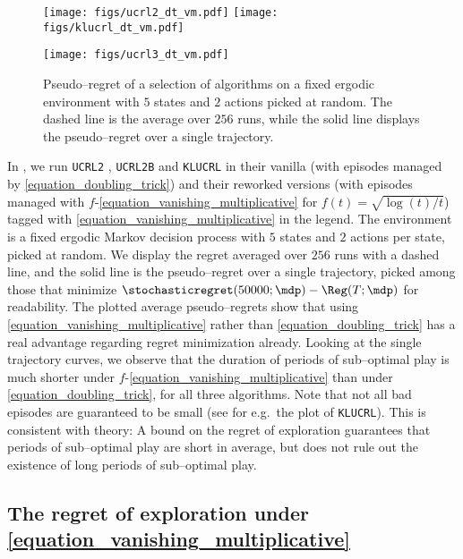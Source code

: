 \documentclass[preprint,cleveref,12pt]{colt2025}
\def\model{\mdp}
\begin{document}
    \begin{figure}[ht]
        \centering
        \texttt{[image: figs/ucrl2\_dt\_vm.pdf]}
        \hfill
        \texttt{[image: figs/klucrl\_dt\_vm.pdf]}

        \texttt{[image: figs/ucrl3\_dt\_vm.pdf]}
        \caption{
        \label{figure_single_trajectories}
            Pseudo--regret of a selection of algorithms on a fixed ergodic environment with $5$ states and $2$ actions picked at random.
            The dashed line is the average over $256$ runs, while the solid line displays the pseudo--regret over a single trajectory. 
        }
    \end{figure}

    In , we run \texttt{UCRL2} \cite{auer_near_optimal_2009}, \texttt{UCRL2B} \cite{fruit_improved_2020} and \texttt{KLUCRL} \cite{filippi_optimism_2010} in their vanilla (with episodes managed by \eqref{equation_doubling_trick}) and their reworked versions (with episodes managed with $f$-\eqref{equation_vanishing_multiplicative} for $f(t) = \sqrt{\log(t)/t}$) tagged with \eqref{equation_vanishing_multiplicative} in the legend.  
    The environment is a fixed ergodic Markov decision process with $5$ states and $2$ actions per state, picked at random. 
    We display the regret averaged over $256$ runs with a dashed line, and the solid line is the pseudo--regret over a single trajectory, picked among those that minimize $\stochasticregret(50000; \model) - \Reg(T; \model)$ for readability. 
    The plotted average pseudo--regrets show that using \eqref{equation_vanishing_multiplicative} rather than \eqref{equation_doubling_trick} has a real advantage regarding regret minimization already.
    Looking at the single trajectory curves, we observe that the duration of periods of sub--optimal play is much shorter under $f$-\eqref{equation_vanishing_multiplicative} than under \eqref{equation_doubling_trick}, for all three algorithms.
    Note that not all bad episodes are guaranteed to be small (see for e.g.~the plot of \texttt{KLUCRL}).
    This is consistent with theory: A bound on the regret of exploration guarantees that periods of sub--optimal play are short in average, but does not rule out the existence of long periods of sub--optimal play. 

    \subsection{The regret of exploration under \eqref{equation_vanishing_multiplicative}}
    \label{appendix_experiments_regret_of_exploration}
\end{document}
